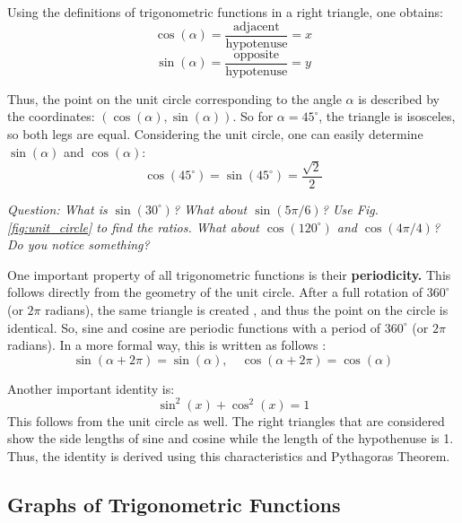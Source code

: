 Using the definitions of trigonometric functions in a right triangle, one obtains:
\begin{equation}
    \cos(\alpha) = \frac{\text{adjacent}}{\text{hypotenuse}} = x
\end{equation}
\begin{equation}
    \sin(\alpha) = \frac{\text{opposite}}{\text{hypotenuse}} = y
\end{equation}

Thus, the point on the unit circle corresponding to the angle $\alpha$ is described by the coordinates: $( \cos(\alpha), \sin(\alpha))$. 
So for $\alpha = 45^\circ$, the triangle is isosceles, so both legs are equal. Considering the unit circle, one can easily determine $\sin(\alpha)$ and $\cos(\alpha)$:
\begin{equation}
    \cos(45^\circ) = \sin(45^\circ) = \frac{\sqrt{2}}{2}
\end{equation}

\textit{Question: What is $\sin(30^\circ)$? What about $\sin(5\pi/6)$? Use Fig. \ref{fig:unit_circle} to find the ratios. What about $\cos(120^\circ)$ and $\cos(4\pi/4)$? Do you notice something?}

One important property of all trigonometric functions is their \textbf{periodicity.} This follows directly from the geometry of the unit circle. After a full rotation of $360^\circ$ (or $2\pi$ radians), the same  triangle is  created , and thus the point on the circle is identical. So, sine and cosine are periodic functions with a period of  $360^\circ$ (or $2\pi$ radians). 
In a more formal way, this is written as follows :
\begin{equation}
    \sin(\alpha + 2\pi) = \sin(\alpha), \quad \cos(\alpha + 2\pi) = \cos(\alpha)
\end{equation}

Another important identity is:
\begin{equation}
    \sin^2(x) + \cos^2(x) = 1
\end{equation}
This follows from the unit circle as well. The right triangles that are considered show the side lengths of sine and cosine while the length of the hypothenuse is 1. Thus, the identity is derived using this characteristics and Pythagoras Theorem.  


\subsection{Graphs of Trigonometric Functions}

